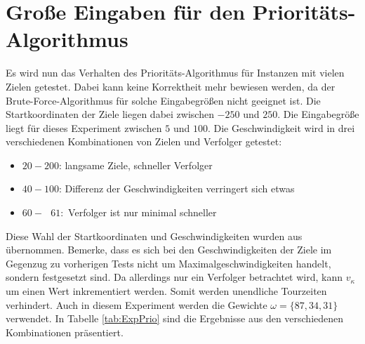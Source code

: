 \documentclass[german,version-2019-11]{uzl-thesis}
\begin{document}
\section{Große Eingaben für den Prioritäts-Algorithmus}
Es wird nun das Verhalten des Prioritäts-Algorithmus für Instanzen mit vielen Zielen getestet. Dabei kann keine Korrektheit mehr bewiesen werden, da der Brute-Force-Algorithmus für solche Eingabegrößen nicht geeignet ist. Die Startkoordinaten der Ziele liegen dabei zwischen $-250$ und $250$. Die Eingabegröße liegt für dieses Experiment zwischen $5$ und $100$. Die Geschwindigkeit wird in drei verschiedenen Kombinationen von Zielen und Verfolger getestet:
\begin{itemize}
\item $20-200$: langsame Ziele, schneller Verfolger
\item $40-100$: Differenz der Geschwindigkeiten verringert sich etwas
\item $60-~~~61$:~Verfolger ist nur minimal schneller
\end{itemize}
Diese Wahl der Startkoordinaten und Geschwindigkeiten wurden aus \cite{stieber2015multiple} übernommen. Bemerke, dass es sich bei den Geschwindigkeiten der Ziele im Gegenzug zu vorherigen Tests nicht um Maximalgeschwindigkeiten handelt, sondern festgesetzt sind. Da allerdings nur ein Verfolger betrachtet wird, kann $v_{\kappa}$ um einen Wert inkrementiert werden. Somit werden unendliche Tourzeiten verhindert. Auch in diesem Experiment werden die Gewichte $\omega = \{87,34,31\}$ verwendet. In Tabelle \ref{tab:ExpPrio} sind die Ergebnisse aus den verschiedenen Kombinationen präsentiert.
\end{document}
